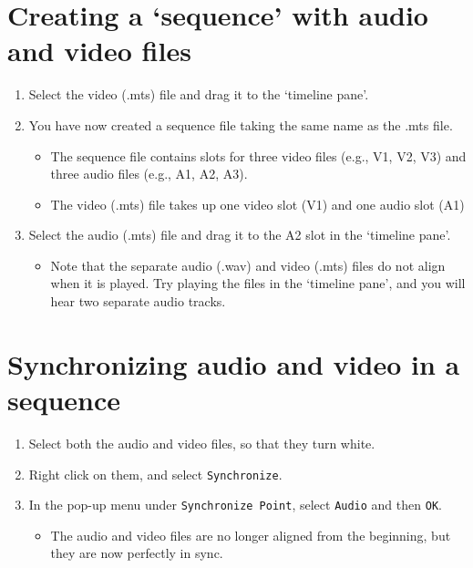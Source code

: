 \documentclass{article}
\begin{document}
\section*{Creating a `sequence' with audio and video files}
\begin{enumerate}
  \item Select the video (.mts) file and drag it to the `timeline pane'.
  \item You have now created a sequence file taking the same name as the .mts file.
  \begin{itemize}
    \item The sequence file contains slots for three video files (e.g., V1, V2, V3) and three audio files (e.g., A1, A2, A3). 
    \item The video (.mts) file takes up one video slot (V1) and one audio slot (A1)
  \end{itemize}
  \item Select the audio (.mts) file and drag it to the A2 slot in the `timeline pane'. 
  \begin{itemize}
    \item Note that the separate audio (.wav) and video (.mts) files do not align when it is played. Try playing the files in the `timeline pane', and you will hear two separate audio tracks.
  \end{itemize}
\end{enumerate}

\section*{Synchronizing audio and video in a sequence}
\begin{enumerate}
  \item Select both the audio and video files, so that they turn white.
  \item Right click on them, and select \texttt{Synchronize}.
  \item In the pop-up menu under \texttt{Synchronize Point}, select \texttt{Audio} and then \texttt{OK}.
  \begin{itemize}
    \item The audio and video files are no longer aligned from the beginning, but they are now perfectly in sync. 
  \end{itemize}
\end{enumerate}
\end{document}
